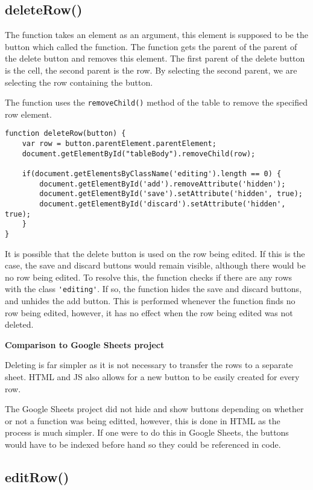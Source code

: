 \documentclass[letterpaper]{article}
\begin{document}
\subsection{deleteRow()}

The function takes an element as an argument, this element is supposed to be the button which called the function.
The function gets the parent of the parent of the delete button and removes this element.
The first parent of the delete button is the cell, the second parent is the row.
By selecting the second parent, we are selecting the row containing the button.

The function uses the \lstinline{removeChild()} method of the table to remove the specified row element.

\begin{lstlisting}[firstnumber=166]
function deleteRow(button) {
    var row = button.parentElement.parentElement;
    document.getElementById("tableBody").removeChild(row);

    if(document.getElementsByClassName('editing').length == 0) {
        document.getElementById('add').removeAttribute('hidden');
        document.getElementById('save').setAttribute('hidden', true);
        document.getElementById('discard').setAttribute('hidden', true);
    }
}
\end{lstlisting}

It is possible that the delete button is used on the row being edited.
If this is the case, the save and discard buttons would remain visible, although there would be no row being edited.
To resolve this, the function checks if there are any rows with the class \lstinline{'editing'}.
If so, the function hides the save and discard buttons, and unhides the add button.
This is performed whenever the function finds no row being edited, however, it has no effect when the row being edited was not deleted.

\textbf{Comparison to Google Sheets project}

Deleting is far simpler as it is not necessary to transfer the rows to a separate sheet.
HTML and JS also allows for a new button to be easily created for every row.

The Google Sheets project did not hide and show buttons depending on whether or not a function was being editted, however, this is done in HTML as the process is much simpler.
If one were to do this in Google Sheets, the buttons would have to be indexed before hand so they could be referenced in code.

\subsection{editRow()}
\end{document}
